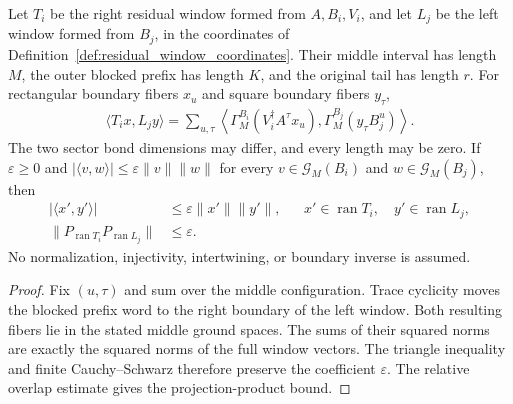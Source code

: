\begin{lemma}
    \label{thm:residual_window_cross_sector_pairing}
    \leanok
    Let $T_i$ be the right residual window formed from $A,B_i,V_i$, and
    let $L_j$ be the left window formed from $B_j$, in the coordinates of
    Definition~\ref{def:residual_window_coordinates}.
    Their middle interval has length $M$, the outer blocked prefix has length
    $K$, and the original tail has length $r$. For rectangular boundary fibers
    $x_u$ and square boundary fibers $y_\tau$,
    \begin{align}
        \langle T_ix,L_jy\rangle
        =\sum_{u,\tau}\left\langle
        \Gamma_M^{B_i}(V_i^\dagger A^\tau x_u),
        \Gamma_M^{B_j}(y_\tau B_j^u)\right\rangle.
    \end{align}
    The two sector bond dimensions may differ, and every length may be zero.
    If $\varepsilon\geq0$ and
    $|\langle v,w\rangle|\leq\varepsilon\|v\|\|w\|$ for every
    $v\in\mathcal G_M(B_i)$ and $w\in\mathcal G_M(B_j)$, then
    \begin{align}
        |\langle x',y'\rangle|                                 & \leq\varepsilon\|x'\|\|y'\|,
                                                               &                              & x'\in\operatorname{ran}T_i,\quad y'\in\operatorname{ran}L_j, \\
        \|P_{\operatorname{ran}T_i}P_{\operatorname{ran}L_j}\| & \leq\varepsilon.
    \end{align}
    No normalization, injectivity, intertwining, or boundary inverse is assumed.
\end{lemma}
\begin{proof}\leanok
    Fix $(u,\tau)$ and sum over the middle configuration. Trace cyclicity
    moves the blocked prefix word to the right boundary of the left window.
    Both resulting fibers lie in the stated middle ground spaces.
    The sums of their squared norms are exactly the squared norms of the
    full window vectors. The triangle inequality and finite
    Cauchy--Schwarz therefore preserve the coefficient $\varepsilon$.
    The relative overlap estimate gives the projection-product bound.
\end{proof}

